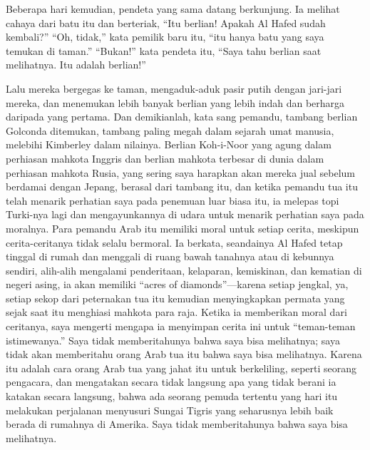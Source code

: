 \documentclass[
  letterpaper,
  DIV=11,
  numbers=noendperiod]{scrreprt}
\begin{document}
Beberapa hari kemudian, pendeta yang sama datang berkunjung. Ia melihat
cahaya dari batu itu dan berteriak, ``Itu berlian! Apakah Al Hafed sudah
kembali?'' ``Oh, tidak,'' kata pemilik baru itu, ``itu hanya batu yang
saya temukan di taman.'' ``Bukan!'' kata pendeta itu, ``Saya tahu
berlian saat melihatnya. Itu adalah berlian!''

Lalu mereka bergegas ke taman, mengaduk-aduk pasir putih dengan
jari-jari mereka, dan menemukan lebih banyak berlian yang lebih indah
dan berharga daripada yang pertama. Dan demikianlah, kata sang pemandu,
tambang berlian Golconda ditemukan, tambang paling megah dalam sejarah
umat manusia, melebihi Kimberley dalam nilainya. Berlian Koh-i-Noor yang
agung dalam perhiasan mahkota Inggris dan berlian mahkota terbesar di
dunia dalam perhiasan mahkota Rusia, yang sering saya harapkan akan
mereka jual sebelum berdamai dengan Jepang, berasal dari tambang itu,
dan ketika pemandu tua itu telah menarik perhatian saya pada penemuan
luar biasa itu, ia melepas topi Turki-nya lagi dan mengayunkannya di
udara untuk menarik perhatian saya pada moralnya. Para pemandu Arab itu
memiliki moral untuk setiap cerita, meskipun cerita-ceritanya tidak
selalu bermoral. Ia berkata, seandainya Al Hafed tetap tinggal di rumah
dan menggali di ruang bawah tanahnya atau di kebunnya sendiri, alih-alih
mengalami penderitaan, kelaparan, kemiskinan, dan kematian di negeri
asing, ia akan memiliki ``acres of diamonds''---karena setiap jengkal,
ya, setiap sekop dari peternakan tua itu kemudian menyingkapkan permata
yang sejak saat itu menghiasi mahkota para raja. Ketika ia memberikan
moral dari ceritanya, saya mengerti mengapa ia menyimpan cerita ini
untuk ``teman-teman istimewanya.'' Saya tidak memberitahunya bahwa saya
bisa melihatnya; saya tidak akan memberitahu orang Arab tua itu bahwa
saya bisa melihatnya. Karena itu adalah cara orang Arab tua yang jahat
itu untuk berkeliling, seperti seorang pengacara, dan mengatakan secara
tidak langsung apa yang tidak berani ia katakan secara langsung, bahwa
ada seorang pemuda tertentu yang hari itu melakukan perjalanan menyusuri
Sungai Tigris yang seharusnya lebih baik berada di rumahnya di Amerika.
Saya tidak memberitahunya bahwa saya bisa melihatnya.
\end{document}
